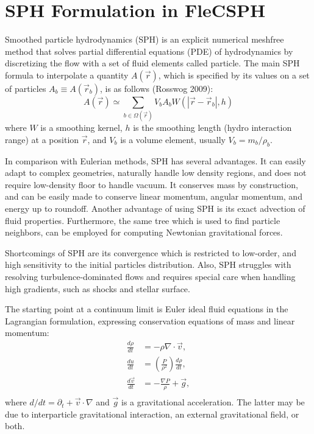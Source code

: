 \documentclass[notes.tex]{subfiles}
\begin{document}
\section{SPH Formulation in FleCSPH}
Smoothed particle hydrodynamics (SPH) is an explicit numerical meshfree method
that solves partial differential equations (PDE) of hydrodynamics by
discretizing the flow with a set of fluid elements called particle. 
The main SPH formula to interpolate a quantity $A(\vec{r})$, which is
specified by its values on a set of particles $A_b \equiv A(\vec{r}_b)$, 
is as follows (Rosswog 2009):
\begin{equation}
A(\vec{r}) \simeq \sum_{b\in\Omega(\vec{r})} V_b A_b W(|\vec{r}-\vec{r}_b|,h)
\end{equation}
where $W$ is a smoothing kernel, 
$h$ is the smoothing length (hydro interaction range) at a position $\vec{r}$, 
and $V_b$ is a volume element, usually $V_b = m_b/\rho_b$.

In comparison with Eulerian methods, SPH has several advantages. It can easily
adapt to complex geometries, naturally handle low density regions, and does
not require low-density floor to handle vacuum. It conserves mass by
construction, and can be easily made to conserve linear momentum, angular
momentum, and energy up to roundoff. Another advantage of using SPH is its
exact advection of fluid properties. Furthermore, the same tree which is used
to find particle neighbors, can be employed for computing Newtonian
gravitational forces.

Shortcomings of SPH are its convergence which is restricted to low-order, 
and high sensitivity to the initial particles distribution. 
Also, SPH struggles with resolving turbulence-dominated flows and requires
special care when handling high gradients, such as shocks and stellar surface.

The starting point at a continuum limit is Euler ideal fluid equations in the
Lagrangian formulation, expressing conservation equations of mass and linear
momentum:
\begin{align}
\frac{d \rho}{d t} &= - \rho \nabla \cdot \vec{v}, \\
\frac{d u}{d t} &= \left( \frac{P}{\rho^2} \right) \frac{d \rho}{d t}, \\
\frac{d \vec{v}}{d t} &= - \frac{\nabla P}{\rho} + \vec{g}, \\
\end{align}
where $d/dt = \partial_t + \vec{v} \cdot \nabla$ and $\vec{g}$ is
a gravitational acceleration. The latter may be due to interparticle
gravitational interaction, an external gravitational field, or both.
\end{document}
